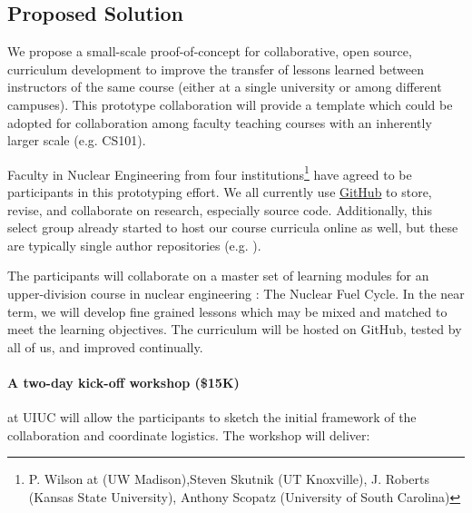 \documentclass[11pt]{article}
\begin{document}
          \subsection*{Proposed Solution}
          We propose a small-scale proof-of-concept for collaborative, open 
          source, curriculum development to improve the transfer of lessons 
          learned between instructors of the same course (either at a single 
          university or among different campuses). This prototype collaboration 
          will provide a template which could be adopted for collaboration 
          among faculty teaching courses with an inherently larger scale (e.g. 
          CS101).

          Faculty in Nuclear Engineering from four institutions\footnote{P.  
          Wilson at (UW Madison),Steven Skutnik (UT Knoxville), J. Roberts 
          (Kansas State University), Anthony Scopatz (University of South 
          Carolina)} have agreed to be participants in 
          this prototyping effort. We all currently use 
          \href{https://github.com}{GitHub} to store, 
          revise, and collaborate on research, especially source code. 
          Additionally, this select group already started to host our course 
          curricula online as well, but these are typically single author 
          repositories (e.g. \cite{huff_npre412_2017}).

          The participants will collaborate on a master set of learning 
          modules for an upper-division course in nuclear engineering : 
          The Nuclear Fuel Cycle. In the near term, we will develop fine 
          grained lessons which may be mixed and matched to meet the 
          learning objectives. The curriculum will be hosted on GitHub, 
          tested by all of us, and improved continually.

          \paragraph{A two-day kick-off workshop (\$15K)} at UIUC will allow the 
          participants to sketch the initial framework of 
          the collaboration and coordinate logistics. The workshop will 
          deliver:
\end{document}
